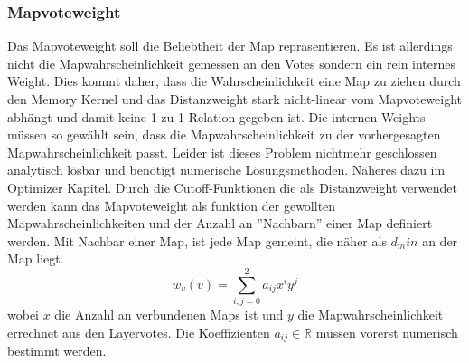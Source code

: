         \subsubsection{Mapvoteweight}
            Das Mapvoteweight soll die Beliebtheit der Map repräsentieren. 
            Es ist allerdings nicht die Mapwahrscheinlichkeit gemessen an den Votes sondern ein rein internes Weight.
            Dies kommt daher, dass die Wahrscheinlichkeit eine Map zu ziehen durch den Memory Kernel und das Distanzweight stark nicht-linear vom Mapvoteweight abhängt und damit keine 1-zu-1 Relation gegeben ist.
            Die internen Weights müssen so gewählt sein, dass die Mapwahrscheinlichkeit zu der vorhergesagten Mapwahrscheinlichkeit passt. 
            Leider ist dieses Problem nichtmehr geschlossen analytisch lösbar und benötigt numerische Lösungsmethoden. 
            Näheres dazu im Optimizer Kapitel.
            Durch die Cutoff-Funktionen die als Distanzweight verwendet werden kann das Mapvoteweight als funktion der gewollten Mapwahrscheinlichkeiten und der Anzahl an ''Nachbarn'' einer Map definiert werden. 
            Mit Nachbar einer Map, ist jede Map gemeint, die näher als $d_min$ an der Map liegt. 
            \begin{equation}
                w_v(v) = \sum_{i,j = 0}^2 a_{ij}x^i y^j
            \end{equation}
            wobei $x$ die Anzahl an verbundenen Maps ist und $y$ die Mapwahrscheinlichkeit errechnet aus den Layervotes.
            Die Koeffizienten $a_{ij}\in\mathbb{R}$ müssen vorerst numerisch bestimmt werden. 
